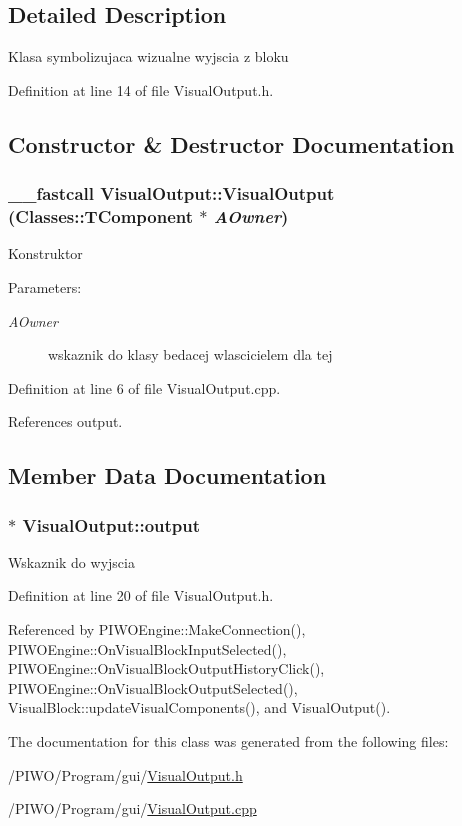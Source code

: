 \subsection{Detailed Description}
Klasa symbolizujaca wizualne wyjscia z bloku 

Definition at line 14 of file VisualOutput.h.

\subsection{Constructor \& Destructor Documentation}
\hypertarget{classVisualOutput_f194cf1b45bd799a81ffa0220653a161}{
\subsubsection[VisualOutput]{\setlength{\rightskip}{0pt plus 5cm}\_\-\_\-fastcall VisualOutput::VisualOutput (Classes::TComponent $\ast$ {\em AOwner})}}
\label{classVisualOutput_f194cf1b45bd799a81ffa0220653a161}


Konstruktor \begin{Desc}
\item[Parameters:]
\begin{description}
\item[{\em AOwner}]wskaznik do klasy bedacej wlascicielem dla tej \end{description}
\end{Desc}


Definition at line 6 of file VisualOutput.cpp.

References output.

\subsection{Member Data Documentation}
\hypertarget{classVisualOutput_1514ca043572331039b22002581a22f8}{
\subsubsection[output]{$\ast$ {\bf VisualOutput::output}}}
\label{classVisualOutput_1514ca043572331039b22002581a22f8}


Wskaznik do wyjscia 

Definition at line 20 of file VisualOutput.h.

Referenced by PIWOEngine::MakeConnection(), PIWOEngine::OnVisualBlockInputSelected(), PIWOEngine::OnVisualBlockOutputHistoryClick(), PIWOEngine::OnVisualBlockOutputSelected(), VisualBlock::updateVisualComponents(), and VisualOutput().

The documentation for this class was generated from the following files:\begin{CompactItemize}
\item 
/PIWO/Program/gui/\hyperlink{VisualOutput_8h}{VisualOutput.h}\item 
/PIWO/Program/gui/\hyperlink{VisualOutput_8cpp}{VisualOutput.cpp}\end{CompactItemize}
